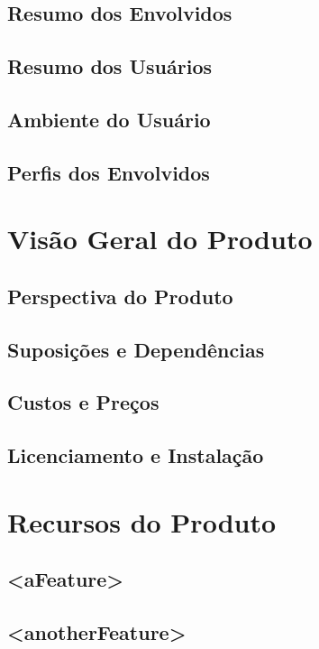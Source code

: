 \subsection{Resumo dos Envolvidos}

\subsection{Resumo dos Usuários}

\subsection{Ambiente do Usuário}

\subsection{Perfis dos Envolvidos}

\section{Visão Geral do Produto}

\subsection{Perspectiva do Produto}

\subsection{Suposições e Dependências}

\subsection{Custos e Preços}

\subsection{Licenciamento e Instalação}

\section{Recursos do Produto}

\subsection{<aFeature>}

\subsection{<anotherFeature>}


